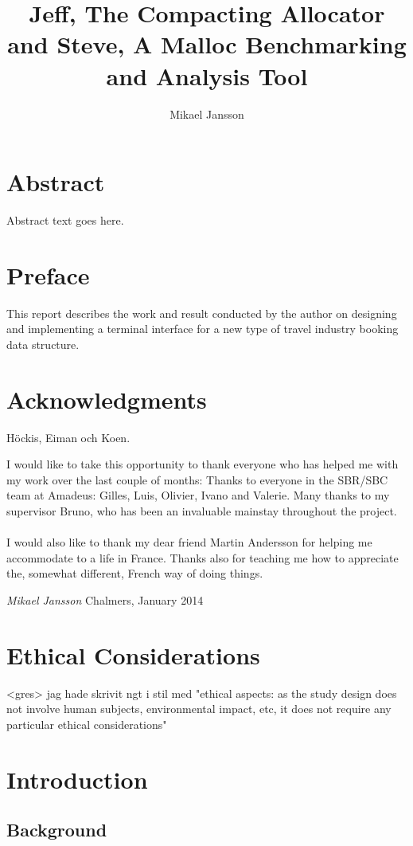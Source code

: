 \documentclass[a4paper,twoside,openany]{report}
\begin{document}
\title{Jeff, The Compacting Allocator and Steve, A Malloc Benchmarking and Analysis Tool}
\author{Mikael Jansson}




\chapter*{Abstract}
Abstract text goes here.

\clearpage
\chapter*{Preface}
This report describes the work and result conducted by the author on designing
and implementing a terminal interface for a new type of travel industry booking
data structure.

\clearpage
\tableofcontents

\clearpage
{}
\chapter*{Acknowledgments}
Höckis, Eiman och Koen.

I would like to take this opportunity to thank everyone who has helped me with
my work over the last couple of months: Thanks to everyone in the SBR/SBC team
at Amadeus: Gilles, Luis, Olivier, Ivano and Valerie. Many thanks to my
supervisor Bruno, who has been an invaluable mainstay throughout the project.
\\\\
I would also like to thank my dear friend Martin Andersson for helping me
accommodate to a life in France. Thanks also for teaching me how to appreciate
the, somewhat different, French way of doing things.

\vspace{3ex}

\noindent
\textit{Mikael Jansson}  Chalmers, January 2014


\clearpage


\chapter{Ethical Considerations}
<gres> jag hade skrivit ngt i stil med "ethical aspects: as the study design does not involve human subjects, environmental impact, etc, it does not require any particular ethical considerations"

\chapter{Introduction}

\section{Background}

\clearpage
\end{document}
